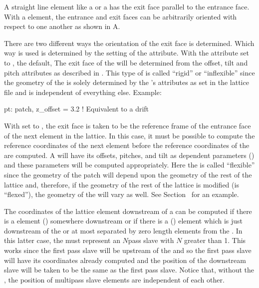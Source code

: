 {A straight line element like a  or a  has the exit face parallel to the
entrance face. With a  element, the entrance and exit faces can be arbitrarily oriented
with respect to one another as shown in A.

There are two different ways the orientation of the exit face is determined. Which way is used is
determined by the setting of the  attribute.  With the  attribute set to
, the default, The exit face of the  will be determined from the offset, tilt
and pitch attributes as described in . This type of  is called
``rigid'' or ``inflexible'' since the geometry of the  is solely determined by the
's attributes as set in the lattice file and is independent of everything else. Example:
\begin{example}
  pt: patch, z_offset = 3.2   ! Equivalent to a drift
\end{example}

With  set to , the exit face is taken to be the reference frame of the
entrance face of the next element in the lattice. In this case, it must be possible to compute the
reference coordinates of the next element before the reference coordinates of the  are
computed. A   will have its offsets, pitches, and tilt as dependent
parameters () and these parameters will be computed appropriately. Here the
 is called ``flexible'' since the geometry of the patch will depend upon the geometry of
the rest of the lattice and, therefore, if the geometry of the rest of the lattice is modified (is
``flexed''), the geometry of the  will vary as well. See Section~ for an
example.

The coordinates of the lattice element downstream of a   can be computed
if there is a  element () somewhere downstream or if there is a
 () element which is just downstream of the  or at
most separated by zero length elements from the . In this latter case, the
 must represent an $N$\Th pass slave with $N$ greater than 1. This works since
the first pass slave will be upstream of the  and so the first pass slave will have its
coordinates already computed and the position of the downstream slave will be taken to be the same
as the first pass slave. Notice that, without the , the position of multipass slave
elements are independent of each other.

}
